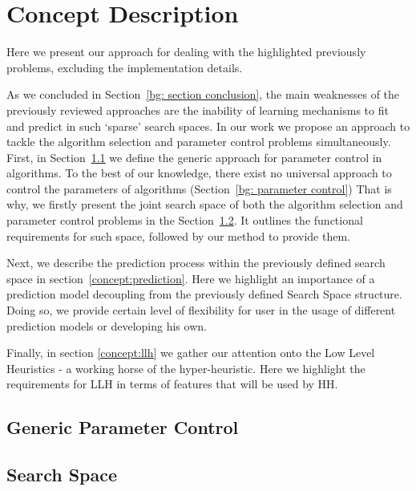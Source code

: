 \chapter{Concept Description}
Here we present our approach for dealing with the highlighted previously problems, excluding the implementation details.


As we concluded in Section~\ref{bg: section conclusion}, the main weaknesses of the previously reviewed approaches are the inability of learning mechanisms to fit and predict in such `sparse' search spaces. In our work we propose an approach to tackle the algorithm selection and parameter control problems simultaneously.
First, in Section~\ref{concept:parameter control} we define the generic approach for parameter control in algorithms. To the best of our knowledge, there exist no universal approach to control the parameters of algorithms (Section~\ref{bg: parameter control})
That is why, we firstly present the joint search space of both the algorithm selection and parameter control problems in the Section~\ref{concept:search space}. It outlines the functional requirements for such space, followed by our method to provide them.

Next, we describe the prediction process within the previously defined search space in section~\ref{concept:prediction}.
Here we highlight an importance of a prediction model decoupling from the previously defined Search Space structure.
Doing so, we provide certain level of flexibility for user in the usage of different prediction models or developing his own.


Finally, in section \ref{concept:llh} we gather our attention onto the Low Level Heuristics - a working horse of the hyper-heuristic.
Here we highlight the requirements for LLH in terms of features that will be used by HH.

\section{Generic Parameter Control}\label{concept:parameter control}


\section{Search Space}\label{concept:search space}
